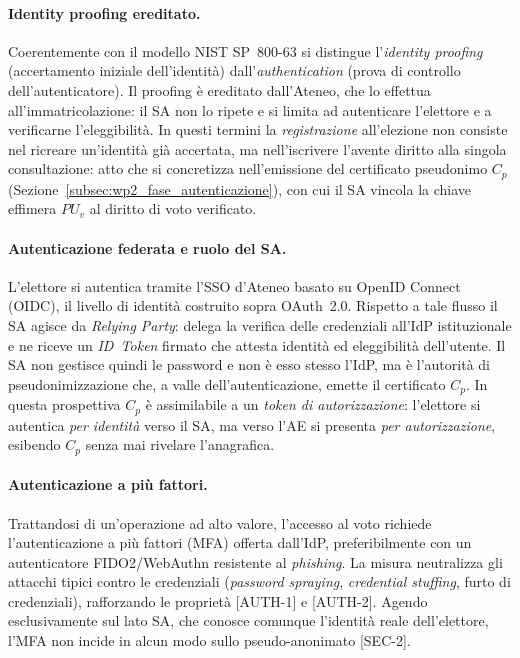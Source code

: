 \paragraph{Identity proofing ereditato.} Coerentemente con il modello NIST SP~800-63 si distingue l'\textit{identity proofing} (accertamento iniziale dell'identità) dall'\textit{authentication} (prova di controllo dell'autenticatore). Il proofing è ereditato dall'Ateneo, che lo effettua all'immatricolazione: il SA non lo ripete e si limita ad autenticare l'elettore e a verificarne l'eleggibilità. In questi termini la \textit{registrazione} all'elezione non consiste nel ricreare un'identità già accertata, ma nell'iscrivere l'avente diritto alla singola consultazione: atto che si concretizza nell'emissione del certificato pseudonimo $C_p$ (Sezione~\ref{subsec:wp2_fase_autenticazione}), con cui il SA vincola la chiave effimera $PU_v$ al diritto di voto verificato.

\paragraph{Autenticazione federata e ruolo del SA.} L'elettore si autentica tramite l'SSO d'Ateneo basato su OpenID Connect (OIDC), il livello di identità costruito sopra OAuth~2.0. Rispetto a tale flusso il SA agisce da \textit{Relying Party}: delega la verifica delle credenziali all'IdP istituzionale e ne riceve un \textit{ID~Token} firmato che attesta identità ed eleggibilità dell'utente. Il SA non gestisce quindi le password e non è esso stesso l'IdP, ma è l'autorità di pseudonimizzazione che, a valle dell'autenticazione, emette il certificato $C_p$. In questa prospettiva $C_p$ è assimilabile a un \textit{token di autorizzazione}: l'elettore si autentica \textit{per identità} verso il SA, ma verso l'AE si presenta \textit{per autorizzazione}, esibendo $C_p$ senza mai rivelare l'anagrafica.

\paragraph{Autenticazione a più fattori.} Trattandosi di un'operazione ad alto valore, l'accesso al voto richiede l'autenticazione a più fattori (MFA) offerta dall'IdP, preferibilmente con un autenticatore FIDO2/WebAuthn resistente al \textit{phishing}. La misura neutralizza gli attacchi tipici contro le credenziali (\textit{password spraying}, \textit{credential stuffing}, furto di credenziali), rafforzando le proprietà [AUTH-1] e [AUTH-2]. Agendo esclusivamente sul lato SA, che conosce comunque l'identità reale dell'elettore, l'MFA non incide in alcun modo sullo pseudo-anonimato [SEC-2].

